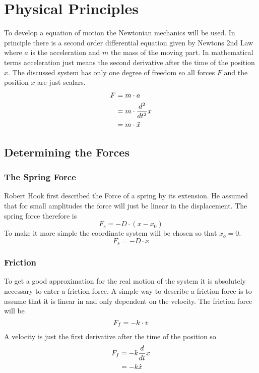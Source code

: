 \section{Physical Principles}
To develop a equation of motion the Newtonian mechanics will be used. In principle there is a second order differential equation given by Newtons 2nd Law where \(a\) is the acceleration and \(m\) the mass of the moving part. In mathematical terms acceleration just means the second derivative after the time of the position \(x\). The discussed system has only one degree of freedom so all forces \(F\) and the position \(x\) are just scalars.
\begin{align}
F &= m \cdot a\notag\\
 &= m \cdot \frac{d^2}{dt^2}x\notag\\
 &= m \cdot \ddot x
\label{2nd_law}
\end{align}
\subsection{Determining the Forces}
\subsubsection{The Spring Force}
Robert Hook first described the Force of a spring by its extension. He assumed that for small amplitudes the force will just be linear in the displacement. The spring force therefore is
\begin{equation}
F_s = -D \cdot \left( x - x_0 \right) \label{gen_spring}
\end{equation}
To make it more simple the coordinate system will be chosen so that \(x_o = 0 \). 
\begin{equation}
F_s = -D \cdot  x
\label{spring}
\end{equation}
\subsubsection{Friction}
To get a good approximation for the real motion of the system it is absolutely necessary to enter a friction force. A simple way to describe a friction force is to assume that it is linear in and only dependent on the velocity. The friction force will be
\begin{equation}
F_f = - k \cdot v
\notag
\end{equation}
A velocity is just the first derivative after the time of the position so
\begin{align}
F_f &= - k \frac{d}{dt} x \notag \\
 &= - k \dot x
\label{friction}
\end{align}
